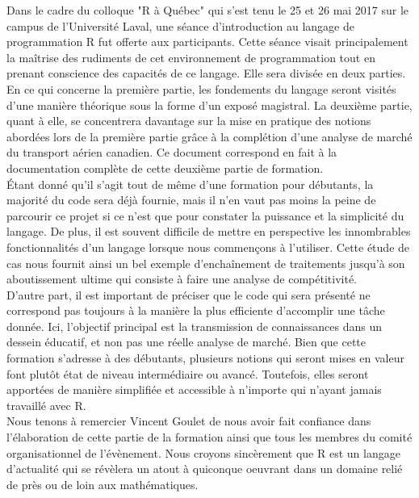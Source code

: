 Dans le cadre du colloque "R à Québec" qui s'est tenu le 25 et 26 mai 2017 sur le campus de l'Université Laval, une séance d'introduction au langage de programmation R fut offerte aux participants. Cette séance visait principalement la maîtrise des rudiments de cet environnement de programmation tout en prenant conscience des capacités de ce langage. \cite{RQC2017} Elle sera divisée en deux parties. En ce qui concerne la première partie, les fondements du langage seront visités d'une manière théorique sous la forme d'un exposé magistral. La deuxième partie, quant à elle, se concentrera davantage sur la mise en pratique des notions abordées lors de la première partie grâce à la complétion d'une analyse de marché du transport aérien canadien. Ce document correspond en fait à la documentation complète de cette deuxième partie de formation. \\

Étant donné qu'il s'agit tout de même d'une formation pour débutants, la majorité du code sera déjà fournie, mais il n'en vaut pas moins la peine de parcourir ce projet si ce n'est que pour constater la puissance et la simplicité du langage. De plus, il est souvent difficile de mettre en perspective les innombrables fonctionnalités d'un langage lorsque nous commençons à l'utiliser. Cette étude de cas nous fournit ainsi un bel exemple d'enchaînement de traitements jusqu'à son aboutissement ultime qui consiste à faire une analyse de compétitivité. \\

D'autre part, il est important de préciser que le code qui sera présenté ne correspond pas toujours à la manière la plus efficiente d'accomplir une tâche donnée. Ici, l'objectif principal est la transmission de connaissances dans un dessein éducatif, et non pas une réelle analyse de marché. Bien que cette formation s'adresse à des débutants, plusieurs notions qui seront mises en valeur font plutôt état de niveau intermédiaire ou avancé. Toutefois, elles seront apportées de manière simplifiée et accessible à n'importe qui n'ayant jamais travaillé avec R. \\

Nous tenons à remercier Vincent Goulet de nous avoir fait confiance dans l'élaboration de cette partie de la formation ainsi que tous les membres du comité organisationnel de l'évènement. Nous croyons sincèrement que R est un langage d'actualité qui se révèlera un atout à quiconque oeuvrant dans un domaine relié de près ou de loin aux mathématiques.